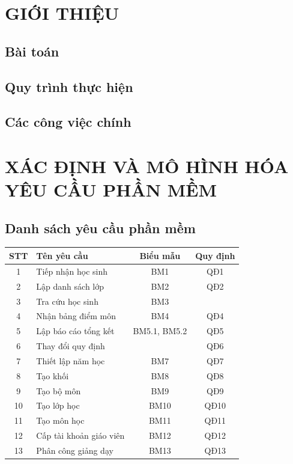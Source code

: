 \documentclass[a4paper]{article}
\begin{document}
\section{GIỚI THIỆU}
\subsection{Bài toán}
\subsection{Quy trình thực hiện}
\subsection{Các công việc chính}

\section{XÁC ĐỊNH VÀ MÔ HÌNH HÓA YÊU CẦU PHẦN MỀM}
	\subsection{Danh sách yêu cầu phần mềm}


\begin{table}[H]
    \centering
    \renewcommand{\arraystretch}{1.5} %
    \setlength{\tabcolsep}{12pt} %
    \begin{tabular}{|c|p{5cm}|c|c|}
  				 
        \hline 			 
        \textbf{STT} & \textbf{Tên yêu cầu} & \textbf{Biểu mẫu} & \textbf{Quy định}  \\ 
        \hline
        1  & Tiếp nhận học sinh & BM1 & QĐ1  \\
        \hline
        2  & Lập danh sách lớp & BM2 & QĐ2  \\
        \hline
        3 & Tra cứu học sinh & BM3 & \\
        \hline
        4 & Nhận bảng điểm môn & BM4 & QĐ4 \\
        \hline
        5 & Lập báo cáo tổng kết & BM5.1, BM5.2 & QĐ5 \\
        \hline
        6 & Thay đổi quy định & & QĐ6 \\
        \hline
         7  & Thiết lập năm học & BM7 & QĐ7\\ 
         \hline
        8 & Tạo khối & BM8 & QĐ8\\
        \hline
        9  & Tạo bộ môn & BM9 & QĐ9\\
        \hline
        10  & Tạo lớp học & BM10 & QĐ10\\
        \hline
        11 & Tạo môn học & BM11 & QĐ11\\
        \hline
        12 & Cấp tài khoản giáo viên & BM12 & QĐ12\\
        \hline 
        13 & Phân công giảng dạy &  BM13 & QĐ13\\
        \hline
    \end{tabular}
\end{table}
\end{document}
